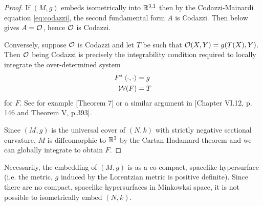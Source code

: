 \documentclass[a4paper, 12pt]{amsart}
\begin{document}
\begin{proof}
If \((M, g)\) embeds isometrically into \(\mathbb{R}^{3,1}\) then by the Codazzi-Mainardi equation \eqref{eq:codazzi}, the second fundamental form \(A\) is Codazzi. Then  below gives \(A = \operatorname{\mathcal{O}}\), hence \(\operatorname{\mathcal{O}}\) is Codazzi.

Conversely, suppose \(\operatorname{\mathcal{O}}\) is Codazzi and let \(T\) be such that \(\operatorname{\mathcal{O}}(X, Y) = g(T(X), Y)\). Then \(\operatorname{\mathcal{O}}\) being Codazzi is precisely the integrability condition required to locally integrate the over-determined system
\begin{align*}
F^{\ast} \left\langle \cdot,\cdot \right\rangle &= g \\
\operatorname{\mathcal{W}}(F) &= T
\end{align*}
for \(F\). See for example \cite{MR1713298}[Theorem 7] or a similar argument in \cite{MR1013365}[Chapter VI.12, p. 146 and Theorem V, p.393].

Since \((M, g)\) is the universal cover of \((N, k)\) with strictly negative sectional curvature, \(M\) is diffeomorphic to \(\mathbb{R}^3\) by the Cartan-Hadamard theorem and we can globally integrate to obtain \(F\).
\end{proof}
\begin{rem}
Necessarily, the embedding of \((M, g)\) is as a co-compact, spacelike hypersurface (i.e. the metric, \(g\) induced by the Lorentzian metric is positive definite). Since there are no compact, spacelike hypersurfaces in Minkowksi space, it is not possible to isometrically embed \((N, k)\).
\end{rem}
\end{document}
